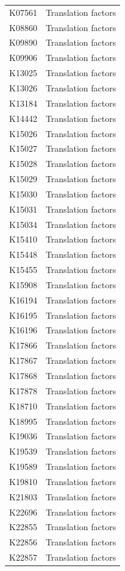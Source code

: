 \begin{longtable}{@{}l l@{}}
K07561 & Translation factors \\
K08860 & Translation factors \\
K09890 & Translation factors \\
K09906 & Translation factors \\
K13025 & Translation factors \\
K13026 & Translation factors \\
K13184 & Translation factors \\
K14442 & Translation factors \\
K15026 & Translation factors \\
K15027 & Translation factors \\
K15028 & Translation factors \\
K15029 & Translation factors \\
K15030 & Translation factors \\
K15031 & Translation factors \\
K15034 & Translation factors \\
K15410 & Translation factors \\
K15448 & Translation factors \\
K15455 & Translation factors \\
K15908 & Translation factors \\
K16194 & Translation factors \\
K16195 & Translation factors \\
K16196 & Translation factors \\
K17866 & Translation factors \\
K17867 & Translation factors \\
K17868 & Translation factors \\
K17878 & Translation factors \\
K18710 & Translation factors \\
K18995 & Translation factors \\
K19036 & Translation factors \\
K19539 & Translation factors \\
K19589 & Translation factors \\
K19810 & Translation factors \\
K21803 & Translation factors \\
K22696 & Translation factors \\
K22855 & Translation factors \\
K22856 & Translation factors \\
K22857 & Translation factors \\

\end{longtable}
